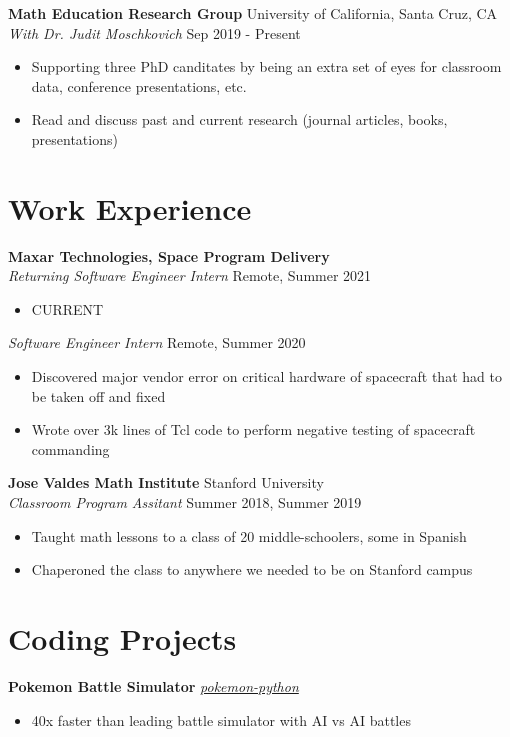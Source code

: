 \documentclass[10pt,letterpaper]{article}
\begin{document}
\textbf{Math Education Research Group} \hfill University of California, Santa Cruz, CA\\
\textit{With Dr. Judit Moschkovich} \hfill Sep 2019 - Present
\begin{itemize}
    \item Supporting three PhD canditates by being an extra set of eyes for classroom data, conference presentations, etc.
    \item Read and discuss past and current research (journal articles, books, presentations)
\end{itemize}


\section*{Work Experience} \hrulefill 

\textbf{Maxar Technologies, Space Program Delivery}\\
\textit{Returning Software Engineer Intern} \hfill Remote, Summer 2021
\begin{itemize}
    \item CURRENT 
\end{itemize}
\textit{Software Engineer Intern} \hfill Remote, Summer 2020
\begin{itemize}
    \item Discovered major vendor error on critical hardware of spacecraft that had to be taken off and fixed
    \item Wrote over 3k lines of Tcl code to perform negative testing of spacecraft commanding
\end{itemize}

\textbf{Jose Valdes Math Institute} \hfill Stanford University\\
\textit{Classroom Program Assitant} \hfill Summer 2018, Summer 2019
\begin{itemize}
    \item Taught math lessons to a class of 20 middle-schoolers, some in Spanish
    \item Chaperoned the class to anywhere we needed to be on Stanford campus
\end{itemize}


\section*{Coding Projects} \hrulefill 

\textbf{Pokemon Battle Simulator} \hfill \href{https://github.com/nicolaslindbloomairey/pokemon-python}{ \textit{pokemon-python}}
\begin{itemize}
    \item 40x faster than leading battle simulator with AI vs AI battles
\end{itemize}
\end{document}
